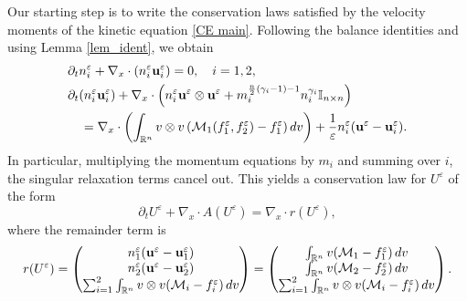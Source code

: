 \documentclass[10pt,reqno]{amsart}
\numberwithin{equation}{section}
\newcommand{\R}{\mathbb R}
\newcommand{\lt}{\left}
\newcommand{\rt}{\right}
\newcommand{\intr}{\int_{\R^n}}
\newcommand{\calM}{\mathcal M}
\newcommand{\p}{\partial}
\newcommand{\ve}{\varepsilon}
\begin{document}
Our starting step is to write the conservation laws satisfied by the velocity moments of the kinetic equation \eqref{CE main}. Following the balance identities and using Lemma \ref{lem_ident}, we obtain
\begin{align*}
&\p_t n_i^\ve + \nabla_x \cdot (n_i^\ve {\bf{u}}_i^\ve) = 0, \quad i=1,2,\\
 &\p_t (n_i^\ve {\bf{u}}_i^\ve) + \nabla_x\cdot \lt(n_i^\ve {\bf{u}}^\ve \otimes {\bf{u}}^\ve + m_i^{\frac{n}{2}(\gamma_i-1)-1 } n_i^{\gamma_i} \mathbb{I}_{n\times n}\rt) \cr
 &\quad = \nabla_x \cdot \left(\intr v\otimes v \lt( \calM_1(f_1^\ve,f_2^\ve) - f_1^\ve  \rt) dv \right)  + \frac{1}{\ve} n_i^\ve ({\bf{u}}^\ve - {\bf{u}}_i^\ve).
\end{align*}
In particular, multiplying the momentum equations by $m_i$ and summing over $i$, the singular relaxation terms cancel out. This yields a conservation law for $U^\varepsilon$ of the form
\[
    \p_t U^\ve + \nabla_x\cdot A(U^\ve) = \nabla_x\cdot r(U^\ve),
\]
where the remainder term is
\[
    r(U^\ve) = \begin{pmatrix} n_1^\ve({\bf{u}}^\ve - {\bf{u}}_1^\ve) \\  n_2^\ve({\bf{u}}^\ve - {\bf{u}}_2^\ve) \\ \sum_{i=1}^2 \intr v\otimes v (\calM_i - f_i^\ve)\,dv \end{pmatrix} = \begin{pmatrix}
        \intr v( \calM_1 - f_1^\ve)\,dv\\
        \intr v( \calM_2 - f_2^\ve)\,dv\\
        \sum_{i=1}^2 \intr v\otimes v (\calM_i - f_i^\ve)\,dv
    \end{pmatrix}.
\]
\end{document}
